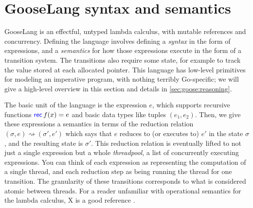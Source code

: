 \section{GooseLang syntax and semantics}%
\label{sec:goose:lang}

\newcommand{\goosedef}[1]{\mathsf{#1}}
\newcommand{\goosekw}[1]{\ensuremath{\goosedef{\textcolor{blue}{#1}}}}
\newcommand{\app}{\:}
\newcommand{\binop}{\circledcirc}
\newcommand{\unop}{\circleddash}

\newcommand{\external}{\mathsf{\textcolor{red}{\langle External \rangle}}}

\newcommand{\gooseif}[3]{\goosekw{if} \app #1 \app%
  \goosekw{then} \app #2 \app \goosekw{else} \app #3}

\newcommand{\recfx}{\goosekw{rec} \, f(x) = e}
\newcommand{\gooselambda}[1]{\goosekw{\lambda}#1.\,}

\newcommand{\reduces}{\rightsquigarrow}
\newcommand{\purereduction}{\overset{\mathrm{pure}}{\reduces}}

\newcommand{\seq}{;\,}
\newcommand{\defeq}{\triangleq}

GooseLang is an effectful, untyped lambda calculus, with mutable references and
concurrency. Defining the language involves defining a \emph{syntax} in the form
of expressions, and a \emph{semantics} for how those expressions execute in the
form of a transition system. The transitions also require some state, for
example to track the value stored at each allocated pointer. This language has
low-level primitives for modeling an imperative program, with nothing terribly
Go-specific; we will give a high-level overview in this section and details in
\cref{sec:goose:reasoning}.

The basic unit of the language is the expression $e$, which supports recursive
functions $\recfx$ and basic data types like tuples $(e_1, e_2)$. Then, we give
these expressions a semantics in terms of the reduction relation
$(\sigma, e) \reduces (\sigma', e')$ which says that $e$ reduces to (or executes
to) $e'$ in the state $\sigma$, and the resulting state is $\sigma'$. This
reduction relation is eventually lifted to not just a single expression but a
whole \emph{threadpool}, a list of concurrently executing expressions. You
can think of each expression as representing the computation of a single thread,
and each reduction step as being running the thread for one transition. The
granularity of these transitions corresponds to what is considered atomic
between threads. For a reader unfamiliar with operational semantics for the
lambda calculus, X is a good reference .

